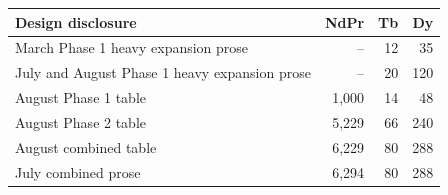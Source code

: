 \begin{tabular}{lrrr}
\toprule Design disclosure & NdPr & Tb & Dy \\
\midrule
March Phase 1 heavy expansion prose & -- & 12 & 35 \\
July and August Phase 1 heavy expansion prose & -- & 20 & 120 \\
August Phase 1 table & 1,000 & 14 & 48 \\
August Phase 2 table & 5,229 & 66 & 240 \\
August combined table & 6,229 & 80 & 288 \\
July combined prose & 6,294 & 80 & 288 \\
\bottomrule
\end{tabular}
